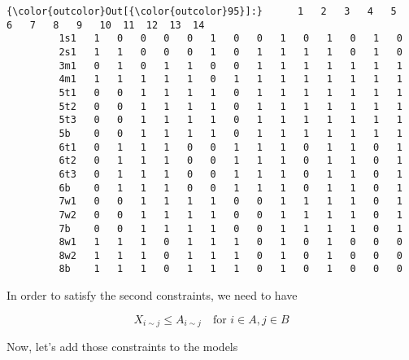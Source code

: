 \documentclass[11pt]{article}
\begin{document}
            \begin{Verbatim}[commandchars=\\\{\}]
{\color{outcolor}Out[{\color{outcolor}95}]:}      1   2   3   4   5   6   7   8   9   10  11  12  13  14
         1s1   1   0   0   0   0   1   0   0   1   0   1   0   1   0
         2s1   1   1   0   0   0   1   0   1   1   1   1   0   1   0
         3m1   0   1   0   1   1   0   0   1   1   1   1   1   1   1
         4m1   1   1   1   1   1   0   1   1   1   1   1   1   1   1
         5t1   0   0   1   1   1   1   0   1   1   1   1   1   1   1
         5t2   0   0   1   1   1   1   0   1   1   1   1   1   1   1
         5t3   0   0   1   1   1   1   0   1   1   1   1   1   1   1
         5b    0   0   1   1   1   1   0   1   1   1   1   1   1   1
         6t1   0   1   1   1   0   0   1   1   1   0   1   1   0   1
         6t2   0   1   1   1   0   0   1   1   1   0   1   1   0   1
         6t3   0   1   1   1   0   0   1   1   1   0   1   1   0   1
         6b    0   1   1   1   0   0   1   1   1   0   1   1   0   1
         7w1   0   0   1   1   1   1   0   0   1   1   1   1   0   1
         7w2   0   0   1   1   1   1   0   0   1   1   1   1   0   1
         7b    0   0   1   1   1   1   0   0   1   1   1   1   0   1
         8w1   1   1   1   0   1   1   1   0   1   0   1   0   0   0
         8w2   1   1   1   0   1   1   1   0   1   0   1   0   0   0
         8b    1   1   1   0   1   1   1   0   1   0   1   0   0   0
\end{Verbatim}
        
    In order to satisfy the second constraints, we need to have

\[ X_{i\sim j} \leq A_{i\sim j} \quad \text{for } i\in A, j\in B\]

Now, let's add those constraints to the models
\end{document}
